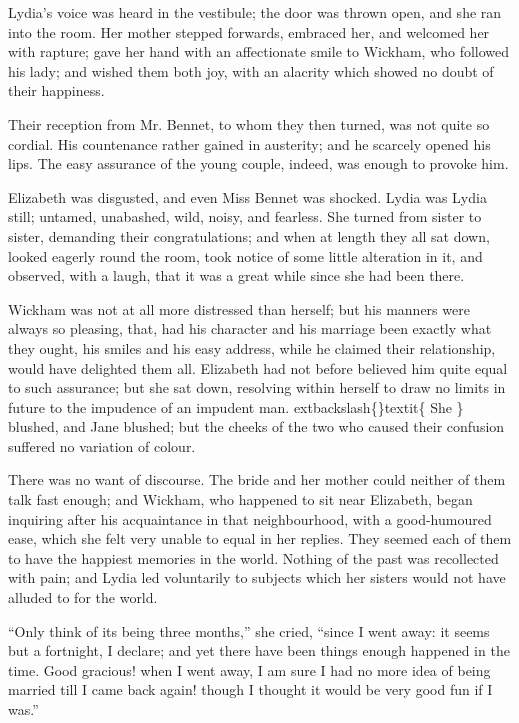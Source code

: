 \documentclass[10pt]{book}
\begin{document}
   Lydia’s voice was heard in the vestibule; the door was thrown open, and
she ran into the room. Her mother stepped forwards, embraced her, and
welcomed her with rapture; gave her hand with an affectionate smile to
Wickham, who followed his lady; and wished them both joy, with an
alacrity which showed no doubt of their happiness.
  

   Their reception from Mr. Bennet, to whom they then turned, was not quite
so cordial. His countenance rather gained in austerity; and he scarcely
opened his lips. The easy assurance of the young couple, indeed, was
enough to provoke him.
  

   Elizabeth was disgusted, and even Miss Bennet was shocked. Lydia was
Lydia still; untamed, unabashed, wild, noisy, and fearless. She turned
from sister to sister, demanding their congratulations; and when at
length they all sat down, looked eagerly round the room, took notice of
some little alteration in it, and observed, with a laugh, that it was a
great while since she had been there.
  

   Wickham was not at all more distressed than herself; but his manners
were always so pleasing, that, had his character and his marriage been
exactly what they ought, his smiles and his easy address, while he
claimed their relationship, would have delighted them all. Elizabeth
   had not before believed him quite equal to such assurance; but she sat
down, resolving within herself to draw no limits in future to the
impudence of an impudent man.
   	extbackslash\{\}textit\{
    She
   \}
   blushed, and Jane blushed; but the
cheeks of the two who caused their confusion suffered no variation of
colour.
  

   There was no want of discourse. The bride and her mother could neither
of them talk fast enough; and Wickham, who happened to sit near
Elizabeth, began inquiring after his acquaintance in that neighbourhood,
with a good-humoured ease, which she felt very unable to equal in her
replies. They seemed each of them to have the happiest memories in the
world. Nothing of the past was recollected with pain; and Lydia led
voluntarily to subjects which her sisters would not have alluded to for
the world.
  

   “Only think of its being three months,” she cried, “since I went away:
it seems but a fortnight, I declare; and yet there have been things
enough happened in the time. Good gracious! when I went away, I am sure
I had no more idea of being married till I came back again! though I
thought it would be very good fun if I was.”
  
\end{document}

